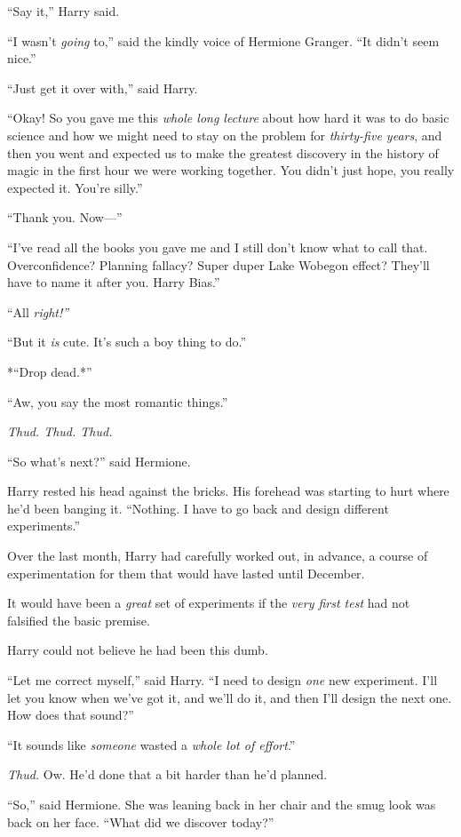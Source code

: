 ``Say it,'' Harry said.

``I wasn't \emph{going} to,'' said the kindly voice of Hermione Granger.
``It didn't seem nice.''

``Just get it over with,'' said Harry.

``Okay! So you gave me this \emph{whole long lecture} about how hard it
was to do basic science and how we might need to stay on the problem for
\emph{thirty-five years}, and then you went and expected us to make the
greatest discovery in the history of magic in the first hour we were
working together. You didn't just hope, you really expected it. You're
silly.''

``Thank you. Now---''

``I've read all the books you gave me and I still don't know what to
call that. Overconfidence? Planning fallacy? Super duper Lake Wobegon
effect? They'll have to name it after you. Harry Bias.''

``All \emph{right!''}

``But it \emph{is} cute. It's such a boy thing to do.''

*``Drop dead.*''

``Aw, you say the most romantic things.''

\emph{Thud. Thud. Thud.}

``So what's next?'' said Hermione.

Harry rested his head against the bricks. His forehead was starting to
hurt where he'd been banging it. ``Nothing. I have to go back and design
different experiments.''

Over the last month, Harry had carefully worked out, in advance, a
course of experimentation for them that would have lasted until
December.

It would have been a \emph{great} set of experiments if the \emph{very
first test} had not falsified the basic premise.

Harry could not believe he had been this dumb.

``Let me correct myself,'' said Harry. ``I need to design \emph{one} new
experiment. I'll let you know when we've got it, and we'll do it, and
then I'll design the next one. How does that sound?''

``It sounds like \emph{someone} wasted a \emph{whole lot of effort}.''

\emph{Thud.} Ow. He'd done that a bit harder than he'd planned.

``So,'' said Hermione. She was leaning back in her chair and the smug
look was back on her face. ``What did we discover today?''

